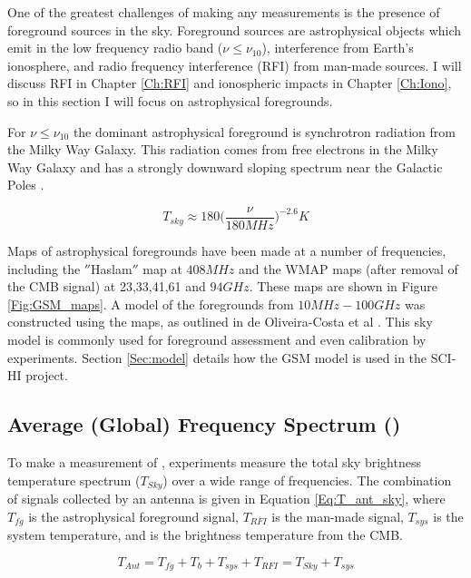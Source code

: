 One of the greatest challenges of making any \cm measurements is the presence of foreground sources in the sky. Foreground sources are astrophysical objects which emit in the low frequency radio band ($\nu \leq \nu_{10}$), interference from Earth's ionosphere, and radio frequency interference (RFI) from man-made sources. I will discuss RFI in Chapter \ref{Ch:RFI} and ionospheric impacts in Chapter \ref{Ch:Iono}, so in this section I will focus on astrophysical foregrounds. 

For $\nu \leq \nu_{10}$ the dominant astrophysical foreground is synchrotron radiation from the Milky Way Galaxy. This radiation comes from free electrons in the Milky Way Galaxy and has a strongly downward sloping spectrum near the Galactic Poles \cite{furlanetto_2006}. 

\begin{equation}\label{Eq:T_sky_approx}
T_{sky} \approx 180 \Big( \frac{\nu}{180 MHz} \Big)^{-2.6} K
\end{equation}

Maps of astrophysical foregrounds have been made at a number of frequencies, including the $''$Haslam$''$ map at $408 MHz$ and the WMAP maps (after removal of the CMB signal) at 23,33,41,61 and $94 GHz$. These maps are shown in Figure \ref{Fig:GSM_maps}. A model of the foregrounds from $10 MHz-100 GHz$ was constructed using the maps, as outlined in de Oliveira-Costa et al \cite{GSM_model}. This sky model is commonly used for foreground assessment and even calibration by \cm experiments. Section \ref{Sec:model} details how the GSM model is used in the SCI-HI project.


\subsection{Average (Global) Frequency Spectrum (\avgdtb)} \label{Sec:avgdtb}

To make a measurement of \avgdtb, experiments measure the total sky brightness temperature spectrum ($T_{Sky}$) over a wide range of frequencies. The combination of signals collected by an antenna is given in Equation \ref{Eq:T_ant_sky}, where $T_{fg}$ is the astrophysical foreground signal, $T_{RFI}$ is the man-made signal, $T_{sys}$ is the system temperature, and \tb is the brightness temperature from the CMB. 

\begin{equation} \label{Eq:T_ant_sky}
T_{Ant} = T_{fg} + T_b +T_{sys}+T_{RFI} = T_{Sky} + T_{sys}
\end{equation}

